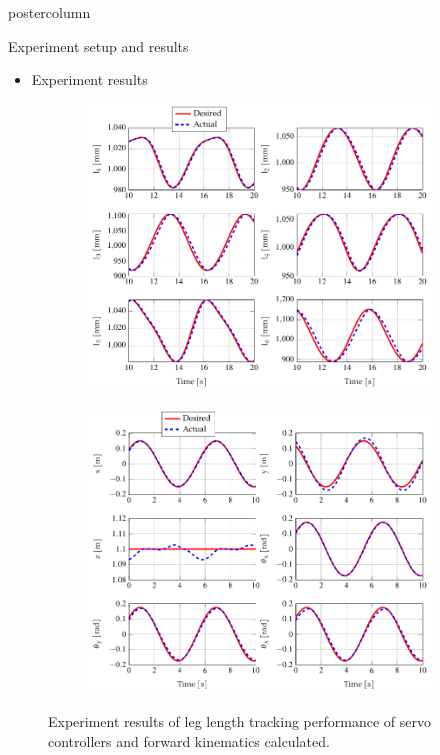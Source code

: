 \documentclass{beamer}
\begin{document}
\begin{frame}
\begin{columns}
\begin{column}{.57\textwidth}
\begin{beamercolorbox}[center]{postercolumn}
\begin{minipage}{.98\textwidth}
{\begin{myblock}{Experiment setup and results}
						\vspace{1em}
						\begin{itemize}
							\item Experiment results
						\end{itemize}
						\begin{figure}
							\begin{subfigure}{0.48\textwidth}
								\centering\includegraphics[width=\textwidth]{img/result1.pdf}
							\end{subfigure}
							\hfill
							\begin{subfigure}{0.48\textwidth}
								\centering\includegraphics[width=\textwidth]{img/result2.pdf}
							\end{subfigure}
							\caption{Experiment results of leg length tracking performance of servo controllers and forward kinematics calculated.}
						\end{figure}
					\end{myblock}\vfill
				
}
\end{minipage}
\end{beamercolorbox}
\end{column}
\end{columns}
\end{frame}
\end{document}
